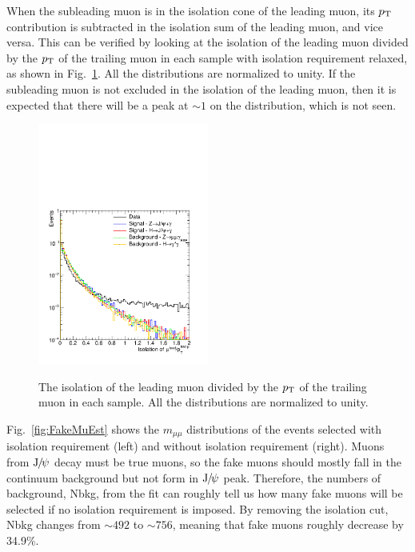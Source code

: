 		When the subleading muon is in the isolation cone of the leading muon, its $p_{\mathrm{T}}$ contribution is subtracted in the isolation sum of the leading muon, and vice versa. This can be verified by looking at the isolation of the leading muon divided by the $p_{\mathrm{T}}$ of the trailing muon in each sample with isolation requirement relaxed, as shown in Fig.~\ref{fig:IsoCheck}. All the distributions are normalized to unity. If the subleading muon is not excluded in the isolation of the leading muon, then it is expected that there will be a peak at $\sim 1$ on the distribution, which is not seen. 
		
		\begin{figure}[!ht]
		  \centering
		  \includegraphics[width=0.5\textwidth]{Fig/Mu1Iso_div_mu2Pt_All}\\
		  \caption{The isolation of the leading muon divided by the $p_{\mathrm{T}}$ of the trailing muon in each sample. All the distributions are normalized to unity.\label{fig:IsoCheck}}
		\end{figure}
		
		Fig.~\ref{fig:FakeMuEst} shows the $m_{\mu\mu}$ distributions of the events selected with isolation requirement (left) and without isolation requirement (right). Muons from ${\mathrm{J}\hspace{-.08em}/\hspace{-.14em}\psi}$ decay must be true muons, so the fake muons should mostly fall in the continuum background but not form in ${\mathrm{J}\hspace{-.08em}/\hspace{-.14em}\psi}$ peak. Therefore, the numbers of background, Nbkg, from the fit can roughly tell us how many fake muons will be selected if no isolation requirement is imposed. By removing the isolation cut, Nbkg changes from $\sim 492$ to $\sim 756$, meaning that fake muons roughly decrease by 34.9\%. 
		
